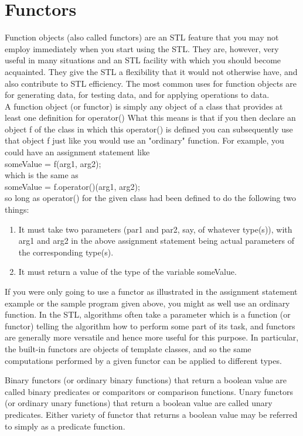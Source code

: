 \section{Functors}
Function objects (also called functors) are an STL feature that you may not employ immediately when you start using the STL. They are, however, very useful in many situations and an STL facility with which you should become acquainted. They give the STL a flexibility that it would not otherwise have, and also contribute to STL efficiency. The most common uses for function objects are for generating data, for testing data, and for applying operations to data.\\

A function object (or functor) is simply any object of a class that provides at least one definition for operator() What this means is that if you then declare an object f of the class in which this operator() is defined you can subsequently use that object f just like you would use an "ordinary" function. For example, you could have an assignment statement like\\

someValue = f(arg1, arg2);\\
which is the same as\\

someValue = f.operator()(arg1, arg2);\\
so long as operator() for the given class had been defined to do the following two things:
\begin{enumerate}
	\item It must take two parameters (par1 and par2, say, of whatever type(s)), with arg1 and arg2 in the above assignment statement being actual parameters of the corresponding type(s).
	\item It must return a value of the type of the variable someValue.
\end{enumerate}
If you were only going to use a functor as illustrated in the assignment statement example or the sample program given above, you might as well use an ordinary function. In the STL, algorithms often take a parameter which is a function (or functor) telling the algorithm how to perform some part of its task, and functors are generally more versatile and hence more useful for this purpose. In particular, the built-in functors are objects of template classes, and so the same computations performed by a given functor can be applied to different types.

Binary functors (or ordinary binary functions) that return a boolean value are called binary predicates or comparitors or comparison functions. Unary functors (or ordinary unary functions) that return a boolean value are called unary predicates. Either variety of functor that returns a boolean value may be referred to simply as a predicate function.
